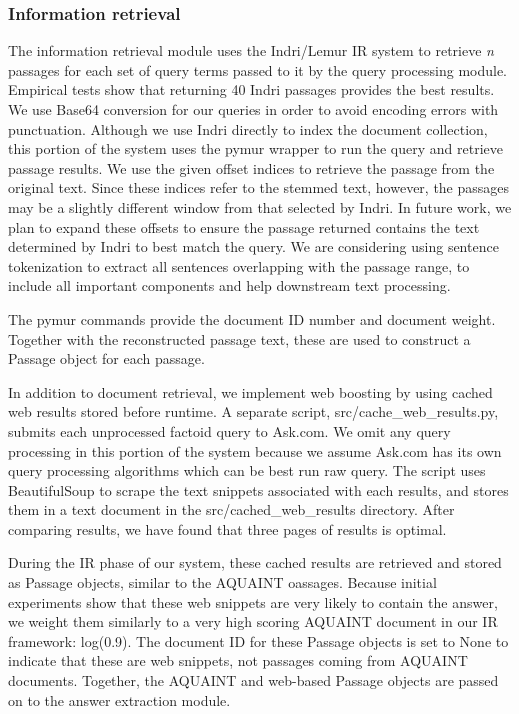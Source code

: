 \documentclass[11pt]{article}
\begin{document}
\subsubsection{Information retrieval}

The information retrieval module uses the Indri/Lemur IR system to retrieve \emph{n} passages for each set of query terms passed to it by the query processing module. Empirical tests show that returning 40 Indri passages provides the best results. We use Base64 conversion for our queries in order to avoid encoding errors with punctuation. Although we use Indri directly to index the document collection, this portion of the system uses the pymur wrapper to run the query and retrieve passage results. We use the given offset indices to retrieve the passage from the original text. Since these indices refer to the stemmed text, however, the passages may be a slightly different window from that selected by Indri. In future work, we plan to expand these offsets to ensure the passage returned contains the text determined by Indri to best match the query.  We are considering using sentence tokenization to extract all sentences overlapping with the passage range, to include all important components and help downstream text processing.

The pymur commands provide the document ID number and document weight. Together with the reconstructed passage text, these are used to construct a Passage object for each passage. 

In addition to document retrieval, we implement web boosting by using cached web results stored before runtime. A separate script, src/cache\_web\_results.py, submits each unprocessed factoid query to Ask.com. We omit any query processing in this portion of the system because we assume Ask.com has its own query processing algorithms which can be best run raw query. The script uses BeautifulSoup to scrape the text snippets associated with each results, and stores them in a text document in the src/cached\_web\_results directory. After comparing results, we have found that three pages of results is optimal. 

During the IR phase of our system, these cached results are retrieved and stored as Passage objects, similar to the AQUAINT oassages. Because initial experiments show that these web snippets are very likely to contain the answer, we weight them similarly to a very high scoring AQUAINT document in our IR framework: log(0.9).  The document ID for these Passage objects is set to None to indicate that these are web snippets, not passages coming from AQUAINT documents.  Together, the AQUAINT and web-based Passage objects are passed on to the answer extraction module. 
\end{document}
